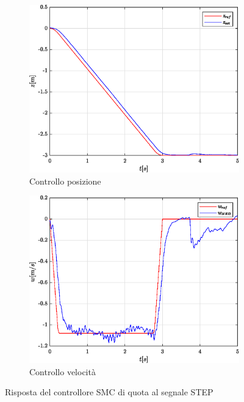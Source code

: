 \begin{figure}
	\centering
	\begin{subfigure}{0.45\textwidth}
		\centering
		\includegraphics[width=1\textwidth]{Simulazioni/Figure/SMC/STEP/AltitudeControlPos}
		\caption{Controllo posizione}
		\label{fig:STEPerrposzSMC}
	\end{subfigure}
	\hfill
	\begin{subfigure}{0.45\textwidth}
		\centering
		\includegraphics[width=1\textwidth]{Simulazioni/Figure/SMC/STEP/AltitudeControlVel}
		\caption{Controllo velocità}
		\label{fig:STEPerrvelzSMC}
	\end{subfigure}
	\caption{Risposta del controllore SMC di quota al segnale STEP}	
\end{figure}

